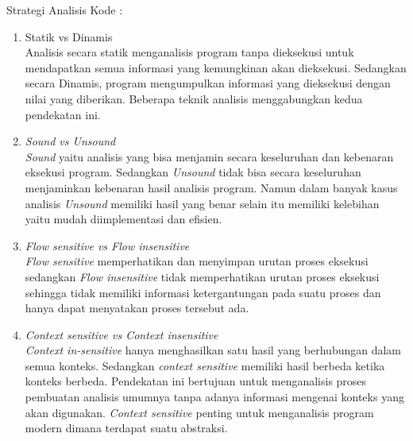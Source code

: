 Strategi Analisis Kode \cite{208}:
\begin{enumerate}[leftmargin=1.3cm]
	\item Statik vs Dinamis\\
	Analisis secara statik menganalisis program tanpa dieksekusi untuk mendapatkan semua informasi yang kemungkinan akan dieksekusi. Sedangkan secara Dinamis, program mengumpulkan informasi yang dieksekusi dengan nilai yang diberikan. Beberapa teknik analisis menggabungkan kedua pendekatan ini.
	\item \textit{Sound vs Unsound}\\
	\textit{Sound} yaitu analisis yang bisa menjamin secara keseluruhan dan kebenaran eksekusi program. Sedangkan \textit{Unsound} tidak bisa secara keseluruhan menjaminkan kebenaran hasil analisis program. Namun dalam banyak kasus analisis \textit{Unsound} memiliki hasil yang benar selain itu memiliki kelebihan yaitu mudah diimplementasi dan efisien.
	\item \textit{Flow sensitive vs Flow insensitive}\\
	\textit{Flow sensitive} memperhatikan dan menyimpan urutan proses eksekusi sedangkan \textit{Flow insensitive} tidak memperhatikan urutan proses eksekusi sehingga tidak memiliki informasi ketergantungan pada suatu proses dan hanya dapat menyatakan proses tersebut ada.
	\item \textit{Context sensitive vs Context insensitive}\\
	\textit{Context in-sensitive} hanya menghasilkan satu hasil yang berhubungan dalam semua konteks. Sedangkan \textit{context sensitive} memiliki hasil berbeda ketika konteks berbeda. Pendekatan ini bertujuan untuk menganalisis proses pembuatan analisis umumnya tanpa adanya informasi mengenai konteks yang akan digunakan. \textit{Context sensitive} penting untuk menganalisis program modern dimana terdapat suatu abstraksi.
\end{enumerate}

